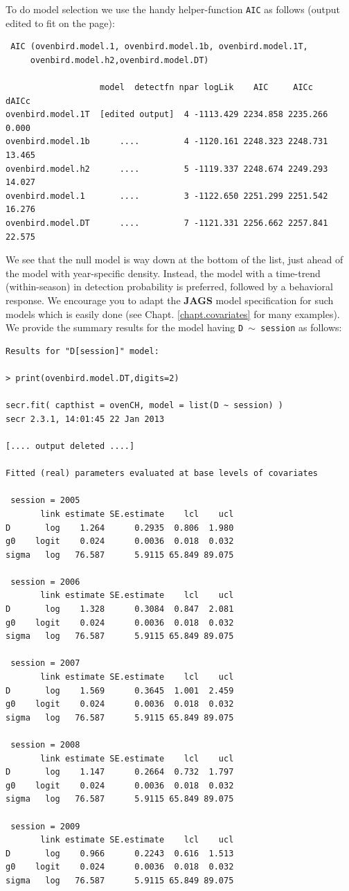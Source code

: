 To do model selection  we use the handy helper-function \mbox{\tt AIC}
as follows (output edited to fit on the page):
{\small
\begin{verbatim}
 AIC (ovenbird.model.1, ovenbird.model.1b, ovenbird.model.1T,
     ovenbird.model.h2,ovenbird.model.DT)

                   model  detectfn npar logLik    AIC     AICc     dAICc 
ovenbird.model.1T  [edited output]  4 -1113.429 2234.858 2235.266  0.000 
ovenbird.model.1b      ....         4 -1120.161 2248.323 2248.731 13.465 
ovenbird.model.h2      ....         5 -1119.337 2248.674 2249.293 14.027 
ovenbird.model.1       ....         3 -1122.650 2251.299 2251.542 16.276 
ovenbird.model.DT      ....         7 -1121.331 2256.662 2257.841 22.575 

\end{verbatim}
}
We see that the null model is way down at the bottom of the list, just
ahead of the model 
with year-specific density. Instead, 
the model with a time-trend (within-season) in detection probability
is preferred, followed by a behavioral response. We encourage you to
adapt the {\bf JAGS} model specification for such models which is easily
done (see Chapt. \ref{chapt.covariates} for many examples).
We provide the summary results for the model having \mbox{\tt D $\sim$
  session} as follows:
{\small
\begin{verbatim}
Results for "D[session]" model:

> print(ovenbird.model.DT,digits=2)

secr.fit( capthist = ovenCH, model = list(D ~ session) )
secr 2.3.1, 14:01:45 22 Jan 2013

[.... output deleted ....]

Fitted (real) parameters evaluated at base levels of covariates 

 session = 2005 
       link estimate SE.estimate    lcl    ucl
D       log    1.264      0.2935  0.806  1.980
g0    logit    0.024      0.0036  0.018  0.032
sigma   log   76.587      5.9115 65.849 89.075

 session = 2006 
       link estimate SE.estimate    lcl    ucl
D       log    1.328      0.3084  0.847  2.081
g0    logit    0.024      0.0036  0.018  0.032
sigma   log   76.587      5.9115 65.849 89.075

 session = 2007 
       link estimate SE.estimate    lcl    ucl
D       log    1.569      0.3645  1.001  2.459
g0    logit    0.024      0.0036  0.018  0.032
sigma   log   76.587      5.9115 65.849 89.075

 session = 2008 
       link estimate SE.estimate    lcl    ucl
D       log    1.147      0.2664  0.732  1.797
g0    logit    0.024      0.0036  0.018  0.032
sigma   log   76.587      5.9115 65.849 89.075

 session = 2009 
       link estimate SE.estimate    lcl    ucl
D       log    0.966      0.2243  0.616  1.513
g0    logit    0.024      0.0036  0.018  0.032
sigma   log   76.587      5.9115 65.849 89.075
\end{verbatim}
}
